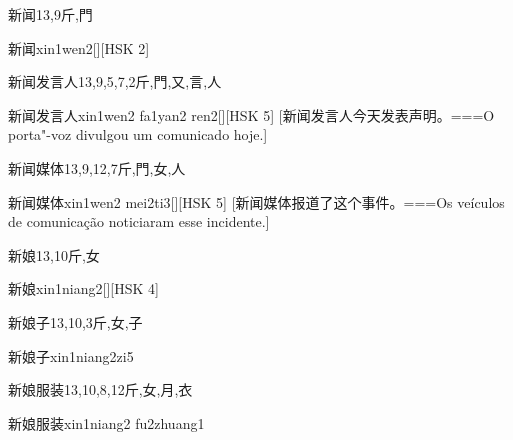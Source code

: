 \begin{Entry}{新闻}{13,9}{⽄,⾨}
  \begin{Phonetics}{新闻}{xin1wen2}[][HSK 2]
  \end{Phonetics}
\end{Entry}

\begin{Entry}{新闻发言人}{13,9,5,7,2}{⽄,⾨,⼜,⾔,⼈}
  \begin{Phonetics}{新闻发言人}{xin1wen2 fa1yan2 ren2}[][HSK 5]
    [新闻发言人今天发表声明。===O porta"-voz divulgou um comunicado hoje.]
  \end{Phonetics}
\end{Entry}

\begin{Entry}{新闻媒体}{13,9,12,7}{⽄,⾨,⼥,⼈}
  \begin{Phonetics}{新闻媒体}{xin1wen2 mei2ti3}[][HSK 5]
    [新闻媒体报道了这个事件。===Os veículos de comunicação noticiaram esse incidente.]
  \end{Phonetics}
\end{Entry}

\begin{Entry}{新娘}{13,10}{⽄,⼥}
  \begin{Phonetics}{新娘}{xin1niang2}[][HSK 4]
  \end{Phonetics}
\end{Entry}

\begin{Entry}{新娘子}{13,10,3}{⽄,⼥,⼦}
  \begin{Phonetics}{新娘子}{xin1niang2zi5}
  \end{Phonetics}
\end{Entry}

\begin{Entry}{新娘服装}{13,10,8,12}{⽄,⼥,⽉,⾐}
  \begin{Phonetics}{新娘服装}{xin1niang2 fu2zhuang1}
  \end{Phonetics}
\end{Entry}

